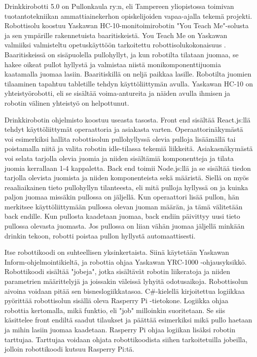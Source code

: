 Drinkkirobotti 5.0 on Pullonkaula ry:n, eli Tampereen yliopistossa toimivan tuotantotekniikan ammattiainekerhon opiskelijoiden vapaa-ajalla tekemä projekti. Robottisolu koostuu Yaskawan HC-10-monitoimirobotin "You Teach Me"-solusta ja sen ympärille rakennetuista baaritiskeistä. You Teach Me on Yaskawan valmiiksi valmisteltu opetuskäyttöön tarkoitettu robottisolukokonaisuus \cite{Yaskawa2017}. Baaritiskeissä on sisäpuolella pullohyllyt, ja kun robotilta tilataan juomaa, se hakee oikeat pullot hyllystä ja valmistaa niistä monikomponenttijuomia kaatamalla juomaa lasiin. Baaritiskillä on neljä paikkaa lasille. Robotilta juomien tilaaminen tapahtuu tabletille tehdyn käyttöliittymän avulla. Yaskawan HC-10 on yhteistyörobotti, eli se sisältää voima-antureita ja näiden avulla ihmisen ja robotin välinen yhteistyö on helpottunut. \cite{Pullonkaula2020}

Drinkkirobotin ohjelmisto koostuu useasta tasosta. Front end sisältää React.js:llä tehdyt käyttöliittymät operaattoria ja asiakasta varten. Operaattorinäkymästä voi esimerkiksi hallita robottisolun pullohyllyssä olevia pulloja lisäämällä tai poistamalla niitä ja valita robotin idle-tilassa tekemiä liikkeitä. Asiakasnäkymästä voi selata tarjolla olevia juomia ja niiden sisältämiä komponentteja ja tilata juomia kerrallaan 1-4 kappaletta. Back end toimii Node.js:llä ja se sisältää tiedon tarjolla olevista juomista ja niiden komponenteista sekä määristä. Siellä on myös reaaliaikainen tieto pullohyllyn tilanteesta, eli mitä pulloja hyllyssä on ja kuinka paljon juomaa missäkin pullossa on jäljellä. Kun operaattori lisää pullon, hän merkitsee käyttöliittymään pullossa olevan juoman määrän, ja tämä välitetään back endille. Kun pullosta kaadetaan juomaa, back endiin päivittyy uusi tieto pullossa olevasta juomasta. Jos pullossa on liian vähän juomaa jäljellä minkään drinkin tekoon, robotti poistaa pullon hyllystä automaattisesti.

Itse robottikoodi on suhteellisen yksinkertaista. Siinä käytetään Yaskawan Inform-ohjelmointikieltä, ja robottia ohjaa Yaskawan YRC-1000 -ohjausyksikkö. Robottikoodi sisältää "jobeja", jotka sisältävät robotin liikeratoja ja niiden parametrien määrittelyjä ja joissakin väleissä lyhyitä odotusaikoja. Robottisolun aivoina voidaan pitää sen bisneslogiikkatasoa. C\#-kielellä kirjoitettua logiikkaa pyörittää robottisolun sisällä oleva Rasperry Pi -tietokone. Logiikka ohjaa robottia kertomalla, mikä funktio, eli "job" milloinkin suoritetaan. Se siis käsittelee front endiltä saadut tilaukset ja päättää esimerkiksi mikä pullo haetaan ja mihin lasiin juomaa kaadetaan. Rasperry Pi ohjaa logiikan lisäksi robotin tarttujaa. Tarttujaa voidaan ohjata robottikoodista siihen tarkoitetuilla jobeilla, jolloin robottikoodi kutsuu Rasperry Pi:tä.

